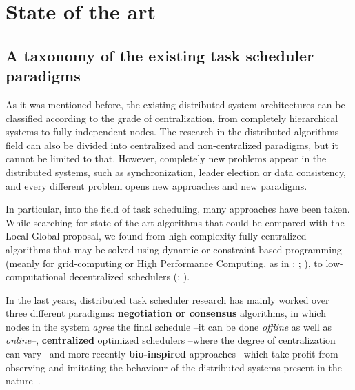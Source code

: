 
\chapter{State of the art} %

\label{Chapter2} %


\section{A taxonomy of the existing task scheduler paradigms}

As it was mentioned before, the existing distributed system architectures can be classified according to the grade of centralization, from completely hierarchical systems to fully independent nodes. The research in the distributed algorithms field can also be divided into centralized and non-centralized paradigms, but it cannot be limited to that. However, completely new problems appear in the distributed systems, such as synchronization, leader election or data consistency,  and every different problem opens new approaches and new paradigms.

In particular, into the field of task scheduling, many approaches have been taken. While searching for state-of-the-art algorithms that could be compared with the Local-Global proposal, we found from high-complexity fully-centralized algorithms that may be solved using dynamic or constraint-based programming (meanly for grid-computing or High Performance Computing, as in \cite{anderson2005high}; \cite{ramamritham1984dynamic}; \cite{yu2005taxonomy}), to low-computational decentralized schedulers (\cite{1310996}; \cite{zhu2007tasks}).

In the last years, distributed task scheduler research has mainly worked over three different paradigms: \textbf{negotiation or consensus} algorithms, in which nodes in the system \emph{agree} the final schedule --it can be done \emph{offline} as well as \emph{online}--, \textbf{centralized} optimized schedulers --where the degree of centralization can vary-- and more recently \textbf{bio-inspired} approaches --which take profit from observing and imitating the behaviour of the distributed systems present in the nature--.

